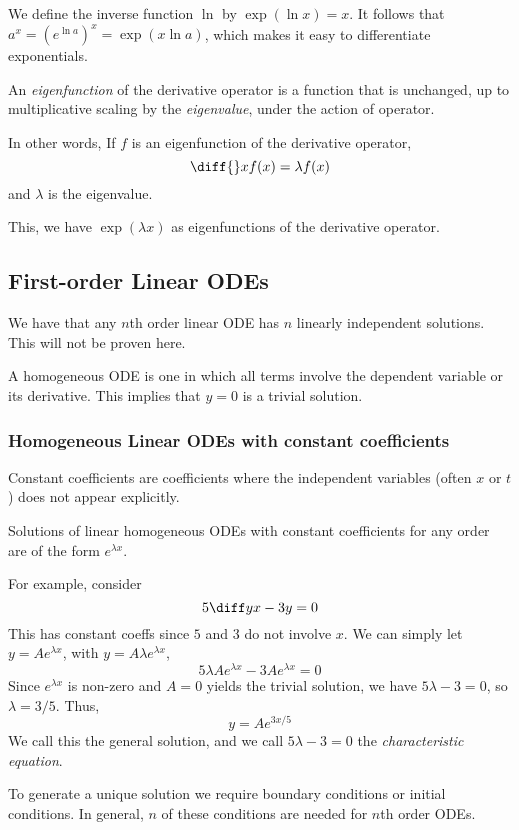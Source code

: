 \documentclass[12pt]{article}
\begin{document}
We define the inverse function $\ln$ by $\exp(\ln x) = x$.
It follows that $a^{x} = (e^{\ln a})^{x} = \exp(x\ln a)$,
which makes it easy to differentiate exponentials.

\begin{definition}
    An \emph{eigenfunction} of the derivative operator
    is a function that is unchanged, up to multiplicative
    scaling by the \emph{eigenvalue}, under the action of operator.
\end{definition}

In other words, If $f$ is an eigenfunction of the derivative operator,
\[
    \diff{}x f(x) = \lambda f(x)
\]
and $\lambda$ is the eigenvalue.

This, we have $\exp(\lambda x)$ as eigenfunctions of the derivative operator.

\subsection{First-order Linear ODEs}

We have that any $n$th order linear ODE has $n$
linearly independent solutions. 
This will not be proven here.

A homogeneous ODE is one in which
all terms involve the dependent variable
or its derivative.
This implies that $y=0$ is a trivial solution.

\subsubsection{Homogeneous Linear ODEs with constant coefficients}

Constant coefficients are coefficients where the independent variables
(often $x$ or $t$) does not appear explicitly.

Solutions of linear homogeneous ODEs with constant coefficients
for any order are of the form $e^{\lambda x}$.

For example, consider
\[
5\diff yx - 3y = 0
\]
This has constant coeffs since $5$ and $3$ do not involve $x$.
We can simply let $y = Ae^{\lambda x}$, with $y=A\lambda e^{\lambda x}$,
\[
5\lambda Ae^{\lambda x} - 3A e^{\lambda x} = 0
\]
Since $e^{\lambda x}$ is non-zero and $A=0$ yields
the trivial solution, we have $5\lambda - 3 = 0$, so $\lambda = 3/5$.
Thus,
\[
y = Ae^{3x/5}
\]
We call this the general solution, 
and we call $5\lambda - 3 = 0$ the \emph{characteristic equation}.

To generate a unique solution we require boundary conditions
or initial conditions.
In general, $n$ of these conditions are needed for $n$th order ODEs.
\end{document}
